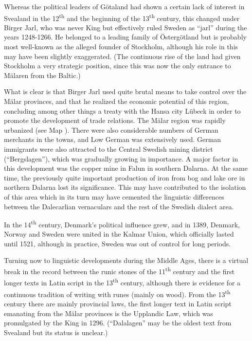 Whereas the political leaders of Götaland had shown a certain lack of interest in Svealand in the 12\textsuperscript{th} and the beginning of the 13\textsuperscript{th} century, this changed under Birger Jarl, who was never King but effectively ruled Sweden as “jarl” during the years 1248-1266. He belonged to a leading family of Östergötland but is probably most well-known as the alleged founder of Stockholm, although his role in this may have been slightly exaggerated. (The continuous rise of the land had given Stockholm a very strategic position, since this was now the only entrance to Mälaren from the Baltic.)




What is clear is that Birger Jarl used quite brutal means to take control over the Mälar provinces, and that he realized the economic potential of this region, concluding among other things a treaty with the Hansa city Lübeck in order to promote the development of trade relations. The Mälar region was rapidly urbanized (see Map ). There were also considerable numbers of German merchants in the towns, and Low German was extensively used. German immigrants were also attracted to the Central Swedish mining district (“Bergslagen”), which was gradually growing in importance. A major factor in this development was the copper mine in Falun in southern Dalarna. At the same time, the previously quite important production of iron from bog and lake ore in northern Dalarna lost its significance. This may have contributed to the isolation of this area which in its turn may have cemented the linguistic differences between the Dalecarlian vernaculars and the rest of the Swedish dialect area. 




In the 14\textsuperscript{th} century, Denmark’s political influence grew, and in 1389, Denmark, Norway and Sweden were united in the Kalmar Union, which officially lasted until 1521, although in practice, Sweden was out of control for long periods. 




Turning now to linguistic developments during the Middle Ages, there is a virtual break in the record between the runic stones of the 11\textsuperscript{th} century and the first longer texts in Latin script in the 13\textsuperscript{th} century, although there is evidence for a continuous tradition of writing with runes (mainly on wood). From the 13\textsuperscript{th} century there are mainly provincial laws, the first longer text in Latin script emanating from the Mälar provinces is the Upplandic Law, which was promulgated by the King in 1296. (“Dalalagen” may be the oldest text from Svealand but its status is unclear.) 




